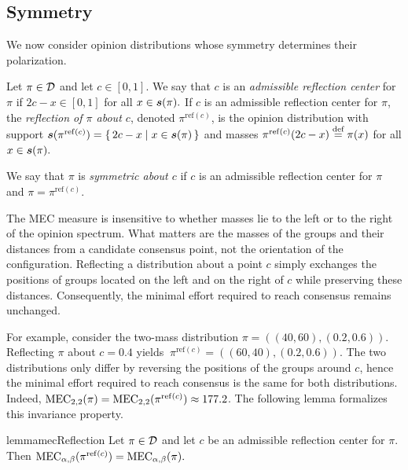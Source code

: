 \subsection{Symmetry}

We now consider opinion distributions whose symmetry determines their polarization.

\begin{definition}
Let $\pi\in\mathcal{D}$ and let $c\in[0,1]$. We say that $c$ is an \emph{admissible reflection center} for $\pi$ if
\(
2c-x\in[0,1] \)
for all \(x\in\boldsymbol{s}(\pi).
\) 
If $c$ is an admissible reflection center for $\pi$, the
\emph{reflection of $\pi$ about $c$}, denoted $\pi^{\mathrm{ref}(c)}$,
is the opinion distribution with support
\(
\boldsymbol{s}(\pi^{\mathrm{ref}(c)})
=
\{\,2c-x \mid x\in\boldsymbol{s}(\pi)\,\}
\)
and masses
\(
\pi^{\mathrm{ref}(c)}(2c-x)\stackrel{\text{def}}{=} \pi(x)
\) for all \( x\in\boldsymbol{s}(\pi).
\) 

We say that $\pi$ is \emph{symmetric about $c$} if $c$ is an admissible
reflection center for $\pi$ and
\(
\pi=\pi^{\mathrm{ref}(c)}.
\)
\end{definition}

The MEC measure is insensitive to whether masses lie to the left or to the
right of the opinion spectrum. What matters are the masses of the groups and
their distances from a candidate consensus point, not the orientation of the
configuration. Reflecting a distribution about a point $c$ simply exchanges the
positions of groups located on the left and on the right of $c$ while
preserving these distances. Consequently, the minimal effort required to reach
consensus remains unchanged.

For example, consider the two-mass distribution
\(
\pi=((40,60),(0.2,0.6)).
\)
Reflecting $\pi$ about $c=0.4$ yields
\(\
\pi^{\mathrm{ref}(c)}=((60,40),(0.2,0.6)).
\)
The two distributions only differ by reversing the positions of the groups
around $c$, hence the minimal
effort required to reach consensus is the same for both distributions. Indeed, $\MEC[2,2](\pi)=\MEC[2,2](\pi^{\mathrm{ref}(c)})\approx 177.2$.
The following lemma formalizes this invariance property. 

\begin{restatable}{lemma}{mecReflection}
\label{lem:mec-reflection}
Let $\pi\in\mathcal{D}$ and let $c$ be an admissible reflection center for $\pi$.
Then
\(
\MEC[\alpha,\beta](\pi^{\mathrm{ref}(c)})
=
\MEC[\alpha,\beta](\pi).
\)
\end{restatable}

